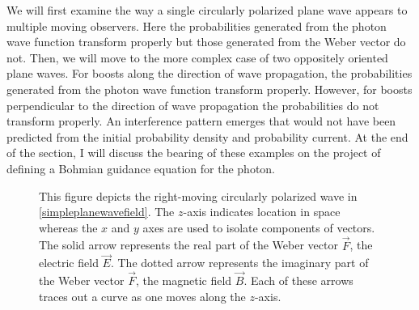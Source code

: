 \documentclass[12pt,secnumarabic,amsmath,amssymb,balancelastpage,nofootinbib]{article}
\begin{document}
We will first examine the way a single circularly polarized plane wave appears to multiple moving observers.  Here the probabilities generated from the photon wave function transform properly but those generated from the Weber vector do not.  Then, we will move to the more complex case of two oppositely oriented plane waves.  For boosts along the direction of wave propagation, the probabilities generated from the photon wave function transform properly.  However, for boosts perpendicular to the direction of wave propagation the probabilities do not transform properly.  An interference pattern emerges that would not have been predicted from the initial probability density and probability current.  At the end of the section, I will discuss the bearing of these examples on the project of defining a Bohmian guidance equation for the photon.


\begin{figure}[h!]
\caption{This figure depicts the right-moving circularly polarized wave in \eqref{simpleplanewavefield}.  The $z$-axis indicates location in space whereas the $x$ and $y$ axes are used to isolate components of vectors.  The solid arrow represents the real part of the Weber vector $\vec{F}$, the electric field $\vec{E}$.  The dotted arrow represents the imaginary part of the Weber vector $\vec{F}$, the magnetic field $\vec{B}$.  Each of these arrows traces out a curve as one moves along the $z$-axis.}
\label{planewavefigure}
\end{figure}
\end{document}
